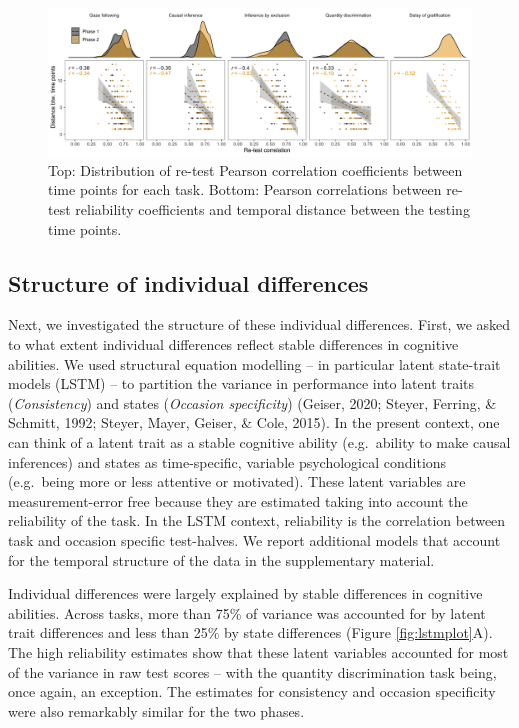 \documentclass[
  man,floatsintext]{apa6}
\begin{document}
\begin{figure}
\includegraphics[width=1\linewidth]{./figures/reliability} \caption{Top: Distribution of re-test Pearson correlation coefficients between time points for each task. Bottom: Pearson correlations between re-test reliability coefficients and temporal distance between the testing time points.}\label{fig:relplot}
\end{figure}

\hypertarget{structure-of-individual-differences}{%
\subsection{Structure of individual differences}\label{structure-of-individual-differences}}

Next, we investigated the structure of these individual differences. First, we asked to what extent individual differences reflect stable differences in cognitive abilities. We used structural equation modelling -- in particular latent state-trait models (LSTM) -- to partition the variance in performance into latent traits (\emph{Consistency}) and states (\emph{Occasion specificity}) (Geiser, 2020; Steyer, Ferring, \& Schmitt, 1992; Steyer, Mayer, Geiser, \& Cole, 2015). In the present context, one can think of a latent trait as a stable cognitive ability (e.g.~ability to make causal inferences) and states as time-specific, variable psychological conditions (e.g.~being more or less attentive or motivated). These latent variables are measurement-error free because they are estimated taking into account the reliability of the task. In the LSTM context, reliability is the correlation between task and occasion specific test-halves. We report additional models that account for the temporal structure of the data in the supplementary material.

Individual differences were largely explained by stable differences in cognitive abilities. Across tasks, more than 75\% of variance was accounted for by latent trait differences and less than 25\% by state differences (Figure \ref{fig:lstmplot}A). The high reliability estimates show that these latent variables accounted for most of the variance in raw test scores -- with the quantity discrimination task being, once again, an exception. The estimates for consistency and occasion specificity were also remarkably similar for the two phases.
\end{document}

